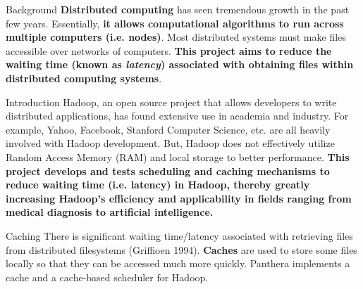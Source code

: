 \documentclass[final]{beamer} %
\begin{document}
  \begin{frame}
    \begin{center}

      \textcolor{black}{
      \textbf{}
      \vspace{0.5em}
      \textbf{}}
    \end{center}
    
    \begin{columns}[t]
     \begin{column}{0.32\textwidth}
      \begin{block}{Background}
      \textbf{Distributed computing} has seen tremendous growth in the past few years. 
      Essentially, \textbf{it allows computational algorithms to run across multiple
      computers (i.e. nodes)}. Most distributed systems must make files accessible over 	networks of computers. \textbf{This 
      project aims to reduce the waiting time (known as \textit{latency}) associated
      with obtaining files within distributed computing systems}.
      \end{block}
      \begin{block}{Introduction}
      Hadoop, an open source project that allows developers to
write distributed applications, has found extensive use in academia and industry. For example, Yahoo, Facebook, Stanford Computer Science, etc. are all heavily involved with Hadoop development. But, Hadoop does not effectively utilize Random Access Memory (RAM) and local storage to better performance. \textbf{This project develops and tests scheduling and caching mechanisms to reduce waiting time (i.e. latency) in Hadoop, thereby greatly increasing Hadoop's efficiency and applicability in fields ranging from medical diagnosis to artificial intelligence.}
      \end{block}

	\begin{block}{Caching}
	There is significant waiting time/latency associated with retrieving files from distributed filesystems (Griffioen 1994). \textbf{Caches} are used to store
	some files locally so that they can be accessed much more quickly. Panthera implements a cache and a cache-based scheduler for Hadoop.
	\end{block}
	

\end{column}
\end{columns}
\end{frame}
\end{document}
